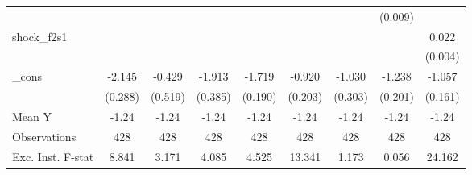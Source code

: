 {\begin{tabular}{l*{8}{c}}
            &                     &                     &                     &                     &                     &                     &     (0.009)         &                     \\
\addlinespace
shock\_f2s1  &                     &                     &                     &                     &                     &                     &                     &       0.022\sym{***}\\
            &                     &                     &                     &                     &                     &                     &                     &     (0.004)         \\
\addlinespace
\_cons      &      -2.145\sym{***}&      -0.429         &      -1.913\sym{***}&      -1.719\sym{***}&      -0.920\sym{***}&      -1.030\sym{***}&      -1.238\sym{***}&      -1.057\sym{***}\\
            &     (0.288)         &     (0.519)         &     (0.385)         &     (0.190)         &     (0.203)         &     (0.303)         &     (0.201)         &     (0.161)         \\
\midrule
Mean Y      &       -1.24         &       -1.24         &       -1.24         &       -1.24         &       -1.24         &       -1.24         &       -1.24         &       -1.24         \\
Observations&         428         &         428         &         428         &         428         &         428         &         428         &         428         &         428         \\
Exc. Inst. F-stat&       8.841         &       3.171         &       4.085         &       4.525         &      13.341         &       1.173         &       0.056         &      24.162         \\
\bottomrule
\end{tabular}
}
